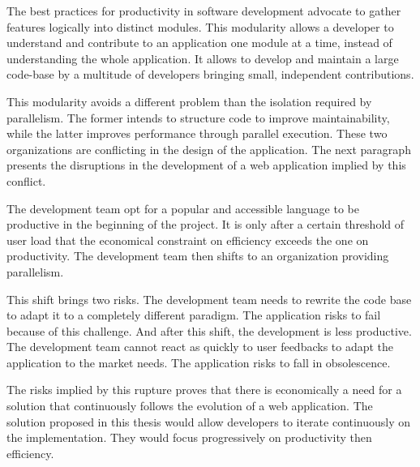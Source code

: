 
The best practices for productivity in software development advocate to gather features logically into distinct modules.
This modularity allows a developer to understand and contribute to an application one module at a time, instead of understanding the whole application.
It allows to develop and maintain a large code-base by a multitude of developers bringing small, independent contributions.

This modularity avoids a different problem than the isolation required by parallelism.
The former intends to structure code to improve maintainability, while the latter improves performance through parallel execution.
These two organizations are conflicting in the design of the application.
The next paragraph presents the disruptions in the development of a web application implied by this conflict.


The development team opt for a popular and accessible language to be productive in the beginning of the project. %
It is only after a certain threshold of user load that the economical constraint on efficiency exceeds the one on productivity.
The development team then shifts to an organization providing parallelism.

This shift brings two risks.
The development team needs to rewrite the code base to adapt it to a completely different paradigm.
The application risks to fail because of this challenge.
And after this shift, the development is less productive.
The development team cannot react as quickly to user feedbacks to adapt the application to the market needs.
The application risks to fall in obsolescence.

The risks implied by this rupture proves that there is economically a need for a solution that continuously follows the evolution of a web application.
The solution proposed in this thesis would allow developers to iterate continuously on the implementation.
They would focus progressively on productivity then efficiency.

